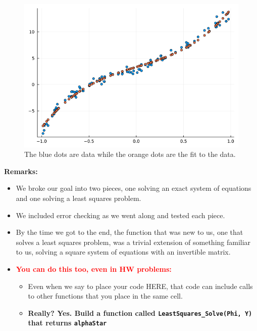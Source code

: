 \begin{figure}[htb]%
	\centering
\includegraphics[width=0.7\columnwidth]{graphics/Chap06/Chap06LinearRegressionFit.png}
\caption[]{The blue dots are data while the orange dots are the fit to the data.}
    \label{fig:RegressionDebugging}
\end{figure}

\begin{tcolorbox}[title={\bf \Large Secret to Building Functions is to Check Them While Building Them}]

\textbf{Remarks:}
\begin{itemize}
    \item We broke our goal into two pieces, one solving an exact system of equations and one solving a least squares problem. 
    \item We included error checking as we went along and tested each piece.
    \item By the time we got to the end, the function that was new to us, one that solves a least squares problem, was a trivial extension of something familiar to us, solving a square system of equations with an invertible matrix.
    \item \textcolor{red}{\bf \Large You can do this too, even in HW problems:}
    \begin{itemize}
        \item Even when we say to place your code HERE, that code can include calls to other functions that you place in the same cell.
        \item {\bf \Large Really? Yes. Build a function called \texttt{LeastSquares\_Solve(Phi, Y)} that returns \texttt{alphaStar}}
    \end{itemize}
\end{itemize}
    
\end{tcolorbox}



